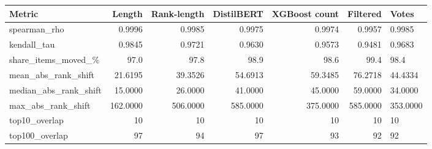 \begin{tabular}{lrrrrr}
\hline
Metric & Length & Rank-length & DistilBERT & XGBoost count & Filtered & Votes \\
\hline
spearman\_rho & 0.9996 & 0.9985 & 0.9975 & 0.9974 & 0.9957 & 0.9985 \\
\hline
kendall\_tau & 0.9845 & 0.9721 & 0.9630 & 0.9573 & 0.9481 & 0.9683 \\
\hline
share\_items\_moved\_\% & 97.0 & 97.8 & 98.9 & 98.6 & 99.4 & 98.4 \\
\hline
mean\_abs\_rank\_shift & 21.6195 & 39.3526 & 54.6913 & 59.3485 & 76.2718 & 44.4334 \\
\hline
median\_abs\_rank\_shift & 15.0000 & 26.0000 & 41.0000 & 45.0000 & 59.0000 & 34.0000 \\
\hline
max\_abs\_rank\_shift & 162.0000 & 506.0000 & 585.0000 & 375.0000 & 585.0000 & 353.0000 \\
\hline
top10\_overlap & 10 & 10 & 10 & 10 & 10 & 10 \\
\hline
top100\_overlap & 97 & 94 & 97 & 93 & 92 & 92 \\
\hline
\end{tabular}
